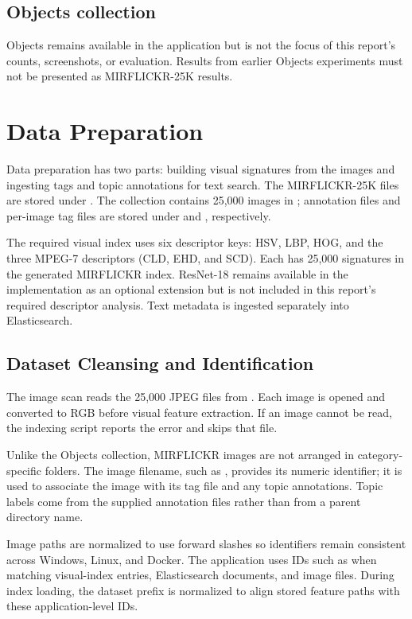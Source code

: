 \documentclass[12pt,a4paper]{article}
\begin{document}
\subsection{Objects collection}
Objects remains available in the application but is not the focus of this
report's counts, screenshots, or evaluation. Results from earlier Objects
experiments must not be presented as MIRFLICKR-25K results.

\section{Data Preparation}
Data preparation has two parts: building visual signatures from the images and
ingesting tags and topic annotations for text search. The MIRFLICKR-25K files
are stored under . The collection contains 25,000
images in ; annotation files and per-image
tag files are stored under  and
, respectively.

The required visual index uses six descriptor keys: HSV, LBP, HOG, and the
three MPEG-7 descriptors (CLD, EHD, and SCD). Each has 25,000 signatures in the
generated MIRFLICKR index. ResNet-18 remains available in the implementation
as an optional extension but is not included in this report's required
descriptor analysis. Text metadata is ingested separately into Elasticsearch.

\subsection{Dataset Cleansing and Identification}
The image scan reads the 25,000 JPEG files from
. Each image is opened and converted to RGB
before visual feature extraction. If an image cannot be read, the indexing
script reports the error and skips that file.

Unlike the Objects collection, MIRFLICKR images are not arranged in
category-specific folders. The image filename, such as ,
provides its numeric identifier; it is used to associate the image with its
tag file and any topic annotations. Topic labels come from the supplied
annotation files rather than from a parent directory name.

Image paths are normalized to use forward slashes so identifiers remain
consistent across Windows, Linux, and Docker. The application uses IDs such as
 when matching visual-index entries, Elasticsearch
documents, and image files. During index loading, the dataset prefix is
normalized to align stored feature paths with these application-level IDs.
\end{document}
